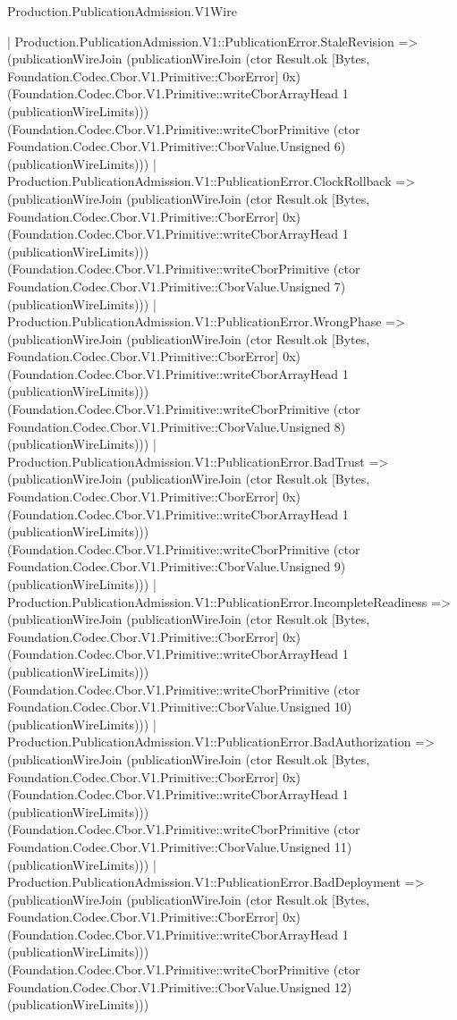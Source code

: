 \begin{lexlean}{Production.PublicationAdmission.V1Wire}
\begin{semanticmodule}
{    | Production.PublicationAdmission.V1::PublicationError.StaleRevision => (publicationWireJoin (publicationWireJoin (ctor Result.ok [Bytes, Foundation.Codec.Cbor.V1.Primitive::CborError] 0x) (Foundation.Codec.Cbor.V1.Primitive::writeCborArrayHead 1 (publicationWireLimits))) (Foundation.Codec.Cbor.V1.Primitive::writeCborPrimitive (ctor Foundation.Codec.Cbor.V1.Primitive::CborValue.Unsigned 6) (publicationWireLimits)))
    | Production.PublicationAdmission.V1::PublicationError.ClockRollback => (publicationWireJoin (publicationWireJoin (ctor Result.ok [Bytes, Foundation.Codec.Cbor.V1.Primitive::CborError] 0x) (Foundation.Codec.Cbor.V1.Primitive::writeCborArrayHead 1 (publicationWireLimits))) (Foundation.Codec.Cbor.V1.Primitive::writeCborPrimitive (ctor Foundation.Codec.Cbor.V1.Primitive::CborValue.Unsigned 7) (publicationWireLimits)))
    | Production.PublicationAdmission.V1::PublicationError.WrongPhase => (publicationWireJoin (publicationWireJoin (ctor Result.ok [Bytes, Foundation.Codec.Cbor.V1.Primitive::CborError] 0x) (Foundation.Codec.Cbor.V1.Primitive::writeCborArrayHead 1 (publicationWireLimits))) (Foundation.Codec.Cbor.V1.Primitive::writeCborPrimitive (ctor Foundation.Codec.Cbor.V1.Primitive::CborValue.Unsigned 8) (publicationWireLimits)))
    | Production.PublicationAdmission.V1::PublicationError.BadTrust => (publicationWireJoin (publicationWireJoin (ctor Result.ok [Bytes, Foundation.Codec.Cbor.V1.Primitive::CborError] 0x) (Foundation.Codec.Cbor.V1.Primitive::writeCborArrayHead 1 (publicationWireLimits))) (Foundation.Codec.Cbor.V1.Primitive::writeCborPrimitive (ctor Foundation.Codec.Cbor.V1.Primitive::CborValue.Unsigned 9) (publicationWireLimits)))
    | Production.PublicationAdmission.V1::PublicationError.IncompleteReadiness => (publicationWireJoin (publicationWireJoin (ctor Result.ok [Bytes, Foundation.Codec.Cbor.V1.Primitive::CborError] 0x) (Foundation.Codec.Cbor.V1.Primitive::writeCborArrayHead 1 (publicationWireLimits))) (Foundation.Codec.Cbor.V1.Primitive::writeCborPrimitive (ctor Foundation.Codec.Cbor.V1.Primitive::CborValue.Unsigned 10) (publicationWireLimits)))
    | Production.PublicationAdmission.V1::PublicationError.BadAuthorization => (publicationWireJoin (publicationWireJoin (ctor Result.ok [Bytes, Foundation.Codec.Cbor.V1.Primitive::CborError] 0x) (Foundation.Codec.Cbor.V1.Primitive::writeCborArrayHead 1 (publicationWireLimits))) (Foundation.Codec.Cbor.V1.Primitive::writeCborPrimitive (ctor Foundation.Codec.Cbor.V1.Primitive::CborValue.Unsigned 11) (publicationWireLimits)))
    | Production.PublicationAdmission.V1::PublicationError.BadDeployment => (publicationWireJoin (publicationWireJoin (ctor Result.ok [Bytes, Foundation.Codec.Cbor.V1.Primitive::CborError] 0x) (Foundation.Codec.Cbor.V1.Primitive::writeCborArrayHead 1 (publicationWireLimits))) (Foundation.Codec.Cbor.V1.Primitive::writeCborPrimitive (ctor Foundation.Codec.Cbor.V1.Primitive::CborValue.Unsigned 12) (publicationWireLimits)))
}
\end{semanticmodule}
\end{lexlean}
